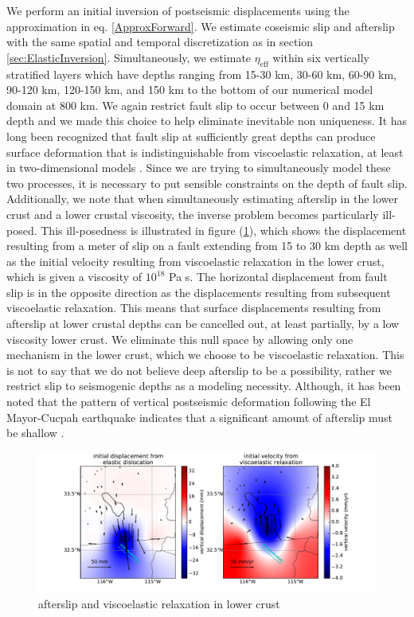 \documentclass[1p]{elsarticle}
\begin{document}
We perform an initial inversion of postseismic displacements using the approximation in eq. \ref{ApproxForward}.  We estimate coseismic slip and afterslip with the same spatial and temporal discretization as in section \ref{sec:ElasticInversion}. Simultaneously, we estimate $\eta_{\mathrm{eff}}$ within six vertically stratified layers which have depths ranging from 15-30 km, 30-60 km, 60-90 km, 90-120 km, 120-150 km, and 150 km to the bottom of our numerical model domain at 800 km.  We again restrict fault slip to occur between 0 and 15 km depth and we made this choice to help eliminate inevitable non uniqueness.  It has long been recognized that fault slip at sufficiently great depths can produce surface deformation that is indistinguishable from viscoelastic relaxation, at least in two-dimensional models \citep{Savage1990}. Since we are trying to simultaneously model these two processes, it is necessary to put sensible constraints on the depth of fault slip.  Additionally, we note that when simultaneously estimating afterslip in the lower crust and a lower crustal viscosity, the inverse problem becomes particularly ill-posed. This ill-posedness is illustrated in figure (\ref{fig:LowerCrust}), which shows the displacement resulting from a meter of slip on a fault extending from 15 to 30 km depth as well as the initial velocity resulting from viscoelastic relaxation in the lower crust, which is given a viscosity of $10^{18}$ Pa s.  The horizontal displacement from fault slip is in the opposite direction as the displacements resulting from subsequent viscoelastic relaxation.  This means that surface displacements resulting from afterslip at lower crustal depths can be cancelled out, at least partially, by a low viscosity lower crust.  We eliminate this null space by allowing only one mechanism in the lower crust, which we choose to be viscoelastic relaxation.  This is not to say that we do not believe deep afterslip to be a possibility, rather we restrict slip to seismogenic depths as a modeling necessity. Although, it has been noted that the pattern of vertical postseismic deformation following the El Mayor-Cucpah earthquake indicates that a significant amount of afterslip must be shallow \cite{Rollins2015}.  
 
\begin{figure}
\includegraphics[scale=0.5]{Figures/lower_crust}
\caption{afterslip and viscoelastic relaxation in lower crust}
\label{fig:LowerCrust}
\end{figure}
 
\end{document}
